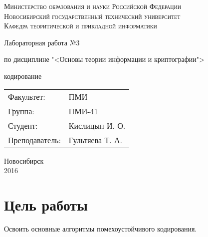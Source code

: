 \documentclass[oneside, final, 12pt]{extarticle}
\begin{document}
\begin{titlepage}
	\begin{centering}
		\textsc{Министерство образования и науки Российской Федерации}\\
		\textsc{Новосибирский государственный технический университет}\\
		\textsc{Кафедра теоритической и прикладной информатики}\\
	\end{centering}
	\vfill
	\vfill
	\vfill
	\Large
	\centerline{Лабораторная работа №3}
	\centerline{по дисциплине "<Основы теории информации и криптографии">}
	\centerline{ кодирование}
	\normalsize
	\vfill
	\vfill
	\vfill
	\begin{flushleft}
		\begin{minipage}{0.3\textwidth}
			\begin{tabular}{l l}
				Факультет: & ПМИ\\
				Группа: & ПМИ-41\\
				Студент: & Кислицын И. О.\\
				Преподаватель: & Гультяева Т. А. 
			\end{tabular}
		\end{minipage}
	\end{flushleft}
	\vfill
	\vfill
	\begin{centering}
		Новосибирск\\
		2016\\
	\end{centering}
\end{titlepage}
\setcounter{page}{2}
\lstset{
	breaklines=\true,
	basicstyle=\footnotesize\ttfamily,
	tabsize=2,
	showspaces=\false,
	breaklines=\true,
	breakatwhitespace=\true,
	extendedchars=\true,
	keepspaces=\true,
	language=Haskell
}
\section{Цель работы}
Освоить основные алгоритмы помехоустойчивого кодирования.
\end{document}
